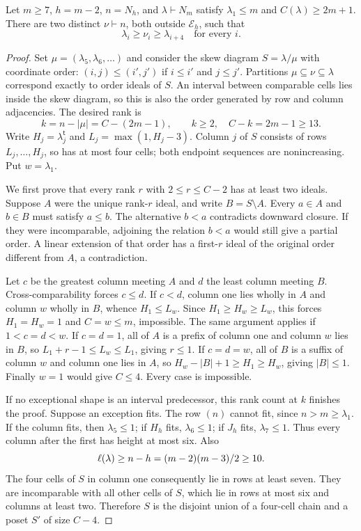 \documentclass[11pt]{article}
\theoremstyle{remark}\newtheorem{remark}[theorem]{Remark}
\newcommand{\trp}{\mathsf t}\newcommand{\eps}{\varepsilon}
\numberwithin{equation}{section}\setlength{\emergencystretch}{2em}
\begin{document}
\begin{lemma}\label{lem:high}
Let $m\ge7$, $h=m-2$, $n=N_h$, and $\lambda\vdash N_m$ satisfy
$\lambda_1\le m$ and $C(\lambda)\ge2m+1$. There are two distinct
$\nu\vdash n$, both outside $\mathcal E_h$, such that
\begin{equation}\label{eq:fourstrip}
 \lambda_i\ge\nu_i\ge\lambda_{i+4}\quad\text{for every }i.
\end{equation}
\end{lemma}
\begin{proof}
Set $\mu=(\lambda_5,\lambda_6,\ldots)$ and consider the skew diagram
$S=\lambda/\mu$ with coordinate order:
$(i,j)\le(i',j')$ if $i\le i'$ and $j\le j'$. Partitions
$\mu\subseteq\nu\subseteq\lambda$ correspond exactly to order ideals
of $S$. An interval between comparable cells lies inside the skew
diagram, so this is also the order generated by row and column adjacencies.
The desired rank is
\[
 k=n-|\mu|=C-(2m-1),\qquad k\ge2,\quad C-k=2m-1\ge13.
\]
Write $H_j=\lambda^{\trp}_j$ and $L_j=\max(1,H_j-3)$. Column $j$
of $S$ consists of rows $L_j,\ldots,H_j$, so has at most four cells;
both endpoint sequences are nonincreasing. Put $w=\lambda_1$.

We first prove that every rank $r$ with $2\le r\le C-2$ has at least
two ideals. Suppose $A$ were the unique rank-$r$ ideal, and write
$B=S\setminus A$. Every $a\in A$ and $b\in B$ must satisfy $a\le b$.
The alternative $b<a$ contradicts downward closure. If they were
incomparable, adjoining the relation $b<a$ would still give a partial
order. A linear extension of that order has a first-$r$ ideal of the
original order different from $A$, a contradiction.

Let $c$ be the greatest column meeting $A$ and $d$ the least column
meeting $B$. Cross-comparability forces $c\le d$. If $c<d$, column one
lies wholly in $A$ and column $w$ wholly in $B$, whence $H_1\le L_w$.
Since $H_1\ge H_w\ge L_w$, this forces $H_1=H_w=1$ and
$C=w\le m$, impossible. The same argument applies if $1<c=d<w$.
If $c=d=1$, all of $A$ is a prefix of column one and column $w$ lies
in $B$, so $L_1+r-1\le L_w\le L_1$, giving $r\le1$.
If $c=d=w$, all of $B$ is a suffix of column $w$ and column one lies
in $A$, so $H_w-|B|+1\ge H_1\ge H_w$, giving $|B|\le1$.
Finally $w=1$ would give $C\le4$. Every case is impossible.

If no exceptional shape is an interval predecessor, this rank count
at $k$ finishes the proof. Suppose an exception fits. The row $(n)$
cannot fit, since $n>m\ge\lambda_1$. If the column fits, then
$\lambda_5\le1$; if $H_h$ fits, $\lambda_6\le1$; if $J_h$ fits,
$\lambda_7\le1$. Thus every column after the first has height at
most six. Also
\[
 \ell(\lambda)\ge n-h=(m-2)(m-3)/2\ge10.
\]
The four cells of $S$ in column one consequently lie in rows at least
seven. They are incomparable with all other cells of $S$, which lie
in rows at most six and columns at least two. Therefore $S$ is the
disjoint union of a four-cell chain and a poset $S'$ of size $C-4$.


\end{proof}
\end{document}
